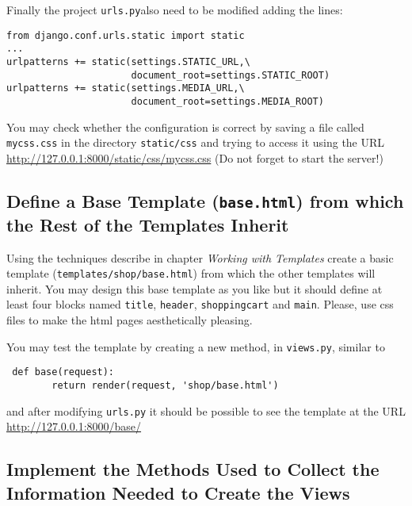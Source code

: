 \documentclass[12pt]{article} %
\newcommand{\ttt}[1]{\texttt{#1}}%
\newcommand{\hhh}[1]{\texttt{#1}}%
\newcommand{\urls}{\texttt{urls.py}}%
\begin{document}
Finally the project \urls also need to be modified adding the lines:

\begin{lstlisting}[label={urls}]
from django.conf.urls.static import static
...
urlpatterns += static(settings.STATIC_URL,\
                      document_root=settings.STATIC_ROOT)
urlpatterns += static(settings.MEDIA_URL,\
                      document_root=settings.MEDIA_ROOT)
\end{lstlisting}

You may check whether the configuration is correct by saving a file called \ttt{mycss.css}
in the directory \texttt{static/css} and trying to access it using the URL
\url{http://127.0.0.1:8000/static/css/mycss.css} (Do not forget to start the server!)

\subsection{Define a Base Template  (\hhh{base.html}) from which the Rest of the Templates  Inherit}
   
   Using the techniques describe in chapter \textit{Working with Templates} create a basic template (\ttt{templates/shop/base.html}) from which the other templates will inherit. 
   You may design this base template as you like but it should define at least four blocks 
   named \ttt{title}, \ttt{header}, \ttt{shoppingcart} and \ttt{main}. Please, use css files to make the html pages aesthetically pleasing.

   You may test the template by creating a new method, in \texttt{views.py}, similar to
   
\begin{verbatim}
 def base(request):
        return render(request, 'shop/base.html')
\end{verbatim}
and after modifying  \urls{} it should be possible to see the template at the URL \url{http://127.0.0.1:8000/base/}

\subsection{Implement the Methods Used to Collect the Information Needed to Create the Views}   

\end{document}
